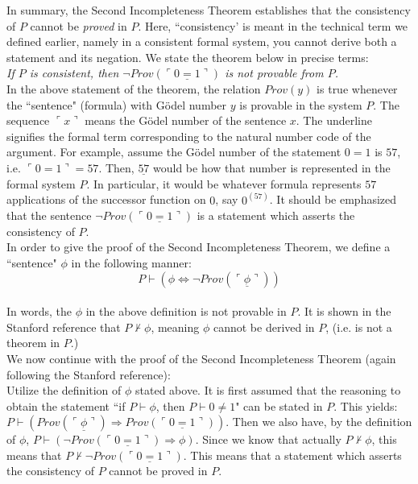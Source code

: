 In summary, the Second Incompleteness Theorem establishes that the consistency of $P$ cannot be \textit{proved} in $P$.  Here, ``consistency' is meant in the technical term we defined earlier, namely in a consistent formal system, you cannot derive both a statement and its negation.  We state the theorem below in precise terms:\\

\textit{If $P$ is consistent, then $\neg Prov (\ulcorner \underline{0=1} \urcorner)$ is not provable from $P$.}\\

In the above statement of the theorem, the relation $Prov (y)$ is true whenever the ``sentence" (formula) with G\"odel number $y$ is provable in the system $P$.  The sequence $\ulcorner x \urcorner$ means the G\"odel number of the sentence $x$.  The underline signifies the formal term corresponding to the natural number code of the argument.  For example, assume the G\"odel number of the statement $0=1$ is $57$, i.e. $\ulcorner 0=1 \urcorner=57$.  Then, $\underline{57}$ would be how that number is represented in the formal system $P$.  In particular, it would be whatever formula represents $57$ applications of the successor function on $0$, say $0^{(57)}$.  It should be emphasized that the sentence $\neg Prov (\ulcorner \underline{0=1} \urcorner)$ is a statement which asserts the consistency of $P$.\\

In order to give the proof of the Second Incompleteness Theorem, we define a ``sentence" $\phi$ in the following manner:\\

\begin{displaymath}
P \vdash (\phi \Longleftrightarrow \neg Prov(\ulcorner \underline{\phi} \urcorner))
\end{displaymath}\\

In words, the $\phi$ in the above definition is not provable in $P$.  It is shown in the Stanford reference that $P \not \vdash \phi$, meaning $\phi$ cannot be derived in $P$, (i.e. is not a theorem in $P$.)\\

We now continue with the proof of the Second Incompleteness Theorem (again following the Stanford reference):\\

Utilize the definition of $\phi$ stated above.  It is first assumed that the reasoning to obtain the statement  ``if $P \vdash \phi$, then $P \vdash 0 \ne 1$" can be stated in $P$.  This yields: $P \vdash (Prov(\ulcorner \underline{\phi} \urcorner) \Longrightarrow Prov(\ulcorner \underline{0=1} \urcorner))$.  Then we also have, by the definition of $\phi$, $P \vdash ( \neg Prov(\ulcorner \underline{0=1} \urcorner) \Longrightarrow \phi)$.  Since we know that actually $P \not \vdash \phi$, this means that $P \not \vdash \neg Prov(\ulcorner \underline{0=1} \urcorner)$.  This means that a statement which asserts the consistency of $P$ cannot be proved in $P$.\\

